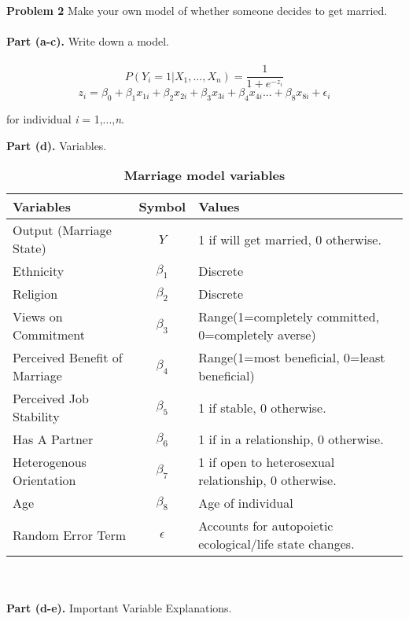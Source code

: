 \documentclass[letterpaper,12pt]{article}
\theoremstyle{definition}
\begin{document}
{

\vspace{5mm}

\noindent\textbf{Problem 2} Make your own model of whether someone decides to get married.
\\
\\
\noindent\textbf{Part (a-c).} Write down a model.
\\
\\
\begin{equation}\label{marriage}
  P\left(Y_{i} = 1 | X_{1},...,X_{n}\right) = \frac{1}{1 + e^{-z_{i}}}
\end{equation}
\begin{equation}
  z_{i} = \beta_0 + \beta_1 x_{1i} + \beta_2 x_{2i} + \beta_3 x_{3i} + \beta_4 x_{4i} ... + \beta_8 x_{8i} + \epsilon_{i}
\end{equation}
\begin{center}for individual \emph{i} = 1,...,\emph{n}. \end{center}

\noindent\textbf{Part (d).} Variables.
\begin{table}[htbp] \centering \captionsetup{width=6.0in}
\caption{\label{Tab}\textbf{Marriage model variables}}
  \begin{threeparttable}
  \begin{tabular}{>{\footnotesize}l |>{\footnotesize}c |>{\footnotesize}l}
    \hline\hline
    Variables & Symbol & Values \\
    \hline
    Output (Marriage State) & $Y$ & 1 if will get married, 0 otherwise. \\
    Ethnicity & $\beta_1$ & Discrete \\
    Religion & $\beta_2$ & Discrete  \\
    Views on Commitment & $\beta_3$ & Range(1=completely committed, 0=completely averse) \\
    Perceived Benefit of Marriage & $\beta_4$ & Range(1=most beneficial, 0=least beneficial) \\
    Perceived Job Stability & $\beta_5$ & 1 if stable, 0 otherwise. \\
    Has A Partner & $\beta_6$ & 1 if in a relationship, 0 otherwise. \\
    Heterogenous Orientation & $\beta_7$ & 1 if open to heterosexual relationship, 0 otherwise. \\
    Age & $\beta_8$ & Age of individual \\
    Random Error Term & $\epsilon$ & Accounts for autopoietic ecological/life state changes. \\
    \hline\hline
  \end{tabular}
  \end{threeparttable}
\end{table}
\\
\\
\noindent\textbf{Part (d-e).} Important Variable Explanations.

}
\end{document}
